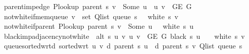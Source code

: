 \begin{isabellebody}
\ \ \ parent{\isacharunderscore}{\kern0pt}imp{\isacharunderscore}{\kern0pt}edge{\isacharcolon}{\kern0pt}\ {\isachardoublequoteopen}P{\isacharunderscore}{\kern0pt}lookup\ {\isacharparenleft}{\kern0pt}parent\ s{\isacharparenright}{\kern0pt}\ v\ {\isacharequal}{\kern0pt}\ Some\ u\ {\isasymLongrightarrow}\ {\isacharbraceleft}{\kern0pt}u{\isacharcomma}{\kern0pt}\ v{\isacharbraceright}{\kern0pt}\ {\isasymin}\ G{\isachardot}{\kern0pt}E\ G{\isachardoublequoteclose}\isanewline
\ \ \ not{\isacharunderscore}{\kern0pt}white{\isacharunderscore}{\kern0pt}if{\isacharunderscore}{\kern0pt}mem{\isacharunderscore}{\kern0pt}queue{\isacharcolon}{\kern0pt}\ {\isachardoublequoteopen}v\ {\isasymin}\ set\ {\isacharparenleft}{\kern0pt}Q{\isacharunderscore}{\kern0pt}list\ {\isacharparenleft}{\kern0pt}queue\ s{\isacharparenright}{\kern0pt}{\isacharparenright}{\kern0pt}\ {\isasymLongrightarrow}\ {\isasymnot}\ white\ s\ v{\isachardoublequoteclose}\isanewline
\ \ \ not{\isacharunderscore}{\kern0pt}white{\isacharunderscore}{\kern0pt}if{\isacharunderscore}{\kern0pt}parent{\isacharcolon}{\kern0pt}\ {\isachardoublequoteopen}P{\isacharunderscore}{\kern0pt}lookup\ {\isacharparenleft}{\kern0pt}parent\ s{\isacharparenright}{\kern0pt}\ v\ {\isacharequal}{\kern0pt}\ Some\ u\ {\isasymLongrightarrow}\ {\isasymnot}\ white\ s\ u{\isachardoublequoteclose}\isanewline
\ \ \ black{\isacharunderscore}{\kern0pt}imp{\isacharunderscore}{\kern0pt}adjacency{\isacharunderscore}{\kern0pt}not{\isacharunderscore}{\kern0pt}white{\isacharcolon}{\kern0pt}\ {\isachardoublequoteopen}{\isasymlbrakk}\ alt\ s\ u\ v{\isacharsemicolon}{\kern0pt}\ {\isacharbraceleft}{\kern0pt}u{\isacharcomma}{\kern0pt}\ v{\isacharbraceright}{\kern0pt}\ {\isasymin}\ G{\isachardot}{\kern0pt}E\ G{\isacharsemicolon}{\kern0pt}\ black\ s\ u\ {\isasymrbrakk}\ {\isasymLongrightarrow}\ {\isasymnot}\ white\ s\ v{\isachardoublequoteclose}\isanewline
\ \ \ queue{\isacharunderscore}{\kern0pt}sorted{\isacharunderscore}{\kern0pt}wrt{\isacharunderscore}{\kern0pt}d{\isacharcolon}{\kern0pt}\ {\isachardoublequoteopen}sorted{\isacharunderscore}{\kern0pt}wrt\ {\isacharparenleft}{\kern0pt}{\isasymlambda}u\ v{\isachardot}{\kern0pt}\ d\ {\isacharparenleft}{\kern0pt}parent\ s{\isacharparenright}{\kern0pt}\ u\ {\isasymle}\ d\ {\isacharparenleft}{\kern0pt}parent\ s{\isacharparenright}{\kern0pt}\ v{\isacharparenright}{\kern0pt}\ {\isacharparenleft}{\kern0pt}Q{\isacharunderscore}{\kern0pt}list\ {\isacharparenleft}{\kern0pt}queue\ s{\isacharparenright}{\kern0pt}{\isacharparenright}{\kern0pt}{\isachardoublequoteclose}\isanewline

\end{isabellebody}
